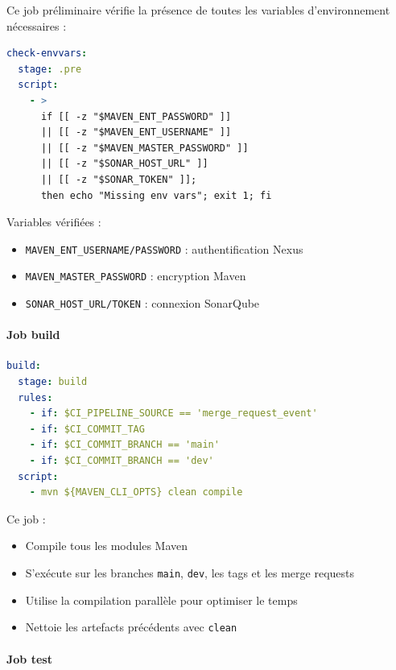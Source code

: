Ce job préliminaire vérifie la présence de toutes les variables d'environnement nécessaires :
\vspace{0.3cm}
\begin{lstlisting}[language=yaml, caption=Verification des variables d'environnement]
check-envvars:
  stage: .pre
  script:
    - >
      if [[ -z "$MAVEN_ENT_PASSWORD" ]]
      || [[ -z "$MAVEN_ENT_USERNAME" ]]
      || [[ -z "$MAVEN_MASTER_PASSWORD" ]]
      || [[ -z "$SONAR_HOST_URL" ]]
      || [[ -z "$SONAR_TOKEN" ]];
      then echo "Missing env vars"; exit 1; fi
\end{lstlisting}

Variables vérifiées :
\begin{itemize}
    \item \texttt{MAVEN\_ENT\_USERNAME/PASSWORD} : authentification Nexus
    \item \texttt{MAVEN\_MASTER\_PASSWORD} : encryption Maven
    \item \texttt{SONAR\_HOST\_URL/TOKEN} : connexion SonarQube
\end{itemize}

\paragraph{Job build}

\vspace{0.3cm}
\begin{lstlisting}[language=yaml, caption=Job de build]
build:
  stage: build
  rules:
    - if: $CI_PIPELINE_SOURCE == 'merge_request_event'
    - if: $CI_COMMIT_TAG
    - if: $CI_COMMIT_BRANCH == 'main'
    - if: $CI_COMMIT_BRANCH == 'dev'
  script:
    - mvn ${MAVEN_CLI_OPTS} clean compile
\end{lstlisting}

Ce job :
\begin{itemize}
    \item Compile tous les modules Maven
    \item S'exécute sur les branches \texttt{main}, \texttt{dev}, les tags et les merge requests
    \item Utilise la compilation parallèle pour optimiser le temps
    \item Nettoie les artefacts précédents avec \texttt{clean}
\end{itemize}

\paragraph{Job test}

